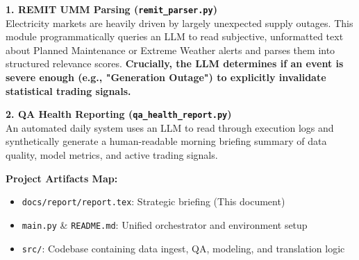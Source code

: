 \documentclass[11pt,a4paper]{article}
\begin{document}
\vspace{0.5em}
\begin{mdframed}[linecolor=primary, linewidth=1.5pt, backgroundcolor=lightgray!30]
\textbf{1. REMIT UMM Parsing (\texttt{remit\_parser.py})}\\
Electricity markets are heavily driven by largely unexpected supply outages. This module programmatically queries an LLM to read subjective, unformatted text about Planned Maintenance or Extreme Weather alerts and parses them into structured relevance scores. \textbf{Crucially, the LLM determines if an event is severe enough (e.g., "Generation Outage") to explicitly invalidate statistical trading signals.}
\end{mdframed}

\vspace{0.5em}

\begin{mdframed}[linecolor=secondary, linewidth=1.5pt, backgroundcolor=lightgray!30]
\textbf{2. QA Health Reporting (\texttt{qa\_health\_report.py})}\\
An automated daily system uses an LLM to read through execution logs and synthetically generate a human-readable morning briefing summary of data quality, model metrics, and active trading signals.
\end{mdframed}

\vspace{0.5em}
\noindent \textbf{Project Artifacts Map:}
\begin{itemize}
    \setlength\itemsep{0em}
    \item \texttt{docs/report/report.tex}: Strategic briefing (This document)
    \item \texttt{main.py} \& \texttt{README.md}: Unified orchestrator and environment setup
    \item \texttt{src/}: Codebase containing data ingest, QA, modeling, and translation logic
\end{itemize}
\end{document}
